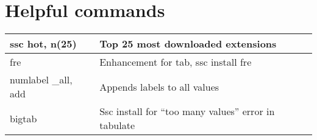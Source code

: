 \documentclass{article}
\begin{document}
\section{Helpful commands}
\begin{table}[h]
\centering
\begin{tabularx}{\linewidth}{ X X }
\hline
ssc hot, n(25) & Top 25 most downloaded extensions \\\hline 
fre & Enhancement for tab, ssc install fre \\\hline 
numlabel \_all, add & Appends labels to all values \\\hline 
bigtab & Ssc install for “too many values” error in tabulate \\\hline 
 \end{tabularx}
\end{table}
\end{document}
